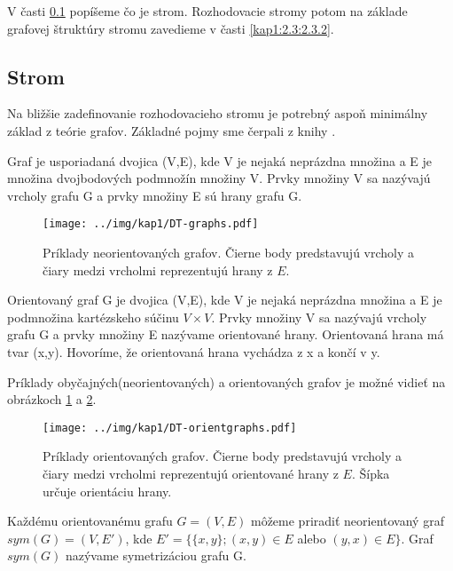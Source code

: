 V časti \ref{kap1:2.3:2.3.1} popíšeme čo je strom. Rozhodovacie stromy potom na základe grafovej štruktúry stromu zavedieme v časti \ref{kap1:2.3:2.3.2}.

\subsection{Strom}\label{kap1:2.3:2.3.1}
Na bližšie zadefinovanie rozhodovacieho stromu je potrebný aspoň minimálny základ z teórie grafov. Základné pojmy sme čerpali z knihy \cite{kap1-KapitolyDiskretka}.
\begin{def-sk}[Graf]\label{kap1:2.3:2.3.1:graf}
Graf je usporiadaná dvojica (V,E), kde V je nejaká neprázdna množina a E je množina dvojbodových podmnožín množiny V. Prvky množiny V sa nazývajú vrcholy grafu G a prvky množiny E sú hrany grafu G.
\end{def-sk}

\begin{figure}[h]
\centering
\centerline{\mbox{\texttt{[image: ../img/kap1/DT-graphs.pdf]}}} 
\caption{Príklady neorientovaných grafov. Čierne body predstavujú vrcholy a čiary medzi vrcholmi reprezentujú hrany z $E$.}\label{fig:decisionTreeGraphs}
\end{figure}

\begin{def-sk}\label{kap1:2.3:2.3.1:orient-graf}
Orientovaný graf G je dvojica (V,E), kde V je nejaká neprázdna množina a E je podmnožina kartézskeho súčinu $V \times V$. Prvky množiny V sa nazývajú vrcholy grafu G a prvky množiny E nazývame orientované hrany. Orientovaná hrana má tvar (x,y). Hovoríme, že orientovaná hrana vychádza z x a končí v y.
\end{def-sk}

Príklady obyčajných(neorientovaných) a orientovaných grafov je možné vidieť na obrázkoch \ref{fig:decisionTreeGraphs} a \ref{fig:decisionTreeOrientGraphs}.

\begin{figure}[h]
\centering
\centerline{\mbox{\texttt{[image: ../img/kap1/DT-orientgraphs.pdf]}}}
\caption{Príklady orientovaných grafov. Čierne body predstavujú vrcholy a čiary medzi vrcholmi reprezentujú orientované hrany z $E$. Šípka určuje orientáciu hrany.}\label{fig:decisionTreeOrientGraphs}
\end{figure}

\begin{def-sk}[Symetrizácia]\label{kap1:2.3:2.3.1:symetrizacia}
Každému orientovanému grafu $G = (V,E)$ môžeme priradiť neorientovaný graf $sym(G) = (V,E')$, kde $E' = \{\{x,y\}; (x,y) \in E$ alebo $(y,x) \in E\}$. Graf $sym(G)$ nazývame symetrizáciou grafu G.
\end{def-sk}

